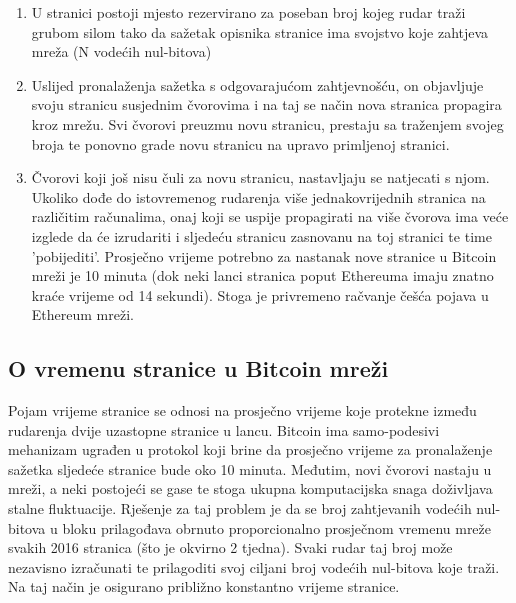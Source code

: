 \documentclass[utf8, zavrsni]{fer}
\begin{document}
\begin{enumerate}
	\item U stranici postoji mjesto rezervirano za poseban broj kojeg rudar traži grubom silom tako da sažetak opisnika stranice ima svojstvo koje zahtjeva mreža (N vodećih nul-bitova)\footnotemark
	\item Uslijed pronalaženja sažetka s odgovarajućom zahtjevnošću, on objavljuje svoju stranicu susjednim čvorovima i na taj se način nova stranica propagira kroz mrežu. Svi čvorovi preuzmu novu stranicu, prestaju sa traženjem svojeg broja te ponovno grade novu stranicu na upravo primljenoj stranici.
	\item Čvorovi koji još nisu čuli za novu stranicu, nastavljaju se natjecati s njom. Ukoliko dođe do istovremenog rudarenja više jednakovrijednih stranica na različitim računalima, onaj koji se uspije propagirati na više čvorova ima veće izglede da će izrudariti i sljedeću stranicu zasnovanu na toj stranici te time 'pobijediti'\footnotemark \footnotemark. Prosječno vrijeme potrebno za nastanak nove stranice u Bitcoin mreži je 10 minuta (dok neki lanci stranica poput Ethereuma imaju znatno kraće vrijeme od 14 sekundi). Stoga je privremeno račvanje češća pojava u Ethereum mreži.
\end{enumerate}

\subsection{O vremenu stranice u Bitcoin mreži}
Pojam vrijeme stranice se odnosi na prosječno vrijeme koje protekne između rudarenja dvije uzastopne stranice u lancu. Bitcoin ima samo-podesivi mehanizam ugrađen u protokol koji brine da prosječno vrijeme za pronalaženje sažetka sljedeće stranice bude oko 10 minuta. Međutim, novi čvorovi nastaju u mreži, a neki postojeći se gase te stoga ukupna komputacijska snaga doživljava stalne fluktuacije. Rješenje za taj problem je da se broj zahtjevanih vodećih nul-bitova u bloku prilagođava obrnuto proporcionalno prosječnom vremenu mreže svakih 2016 stranica (što je okvirno 2 tjedna). Svaki rudar taj broj može nezavisno izračunati te prilagoditi svoj ciljani broj vodećih nul-bitova koje traži. Na taj način je osigurano približno konstantno vrijeme stranice.
\end{document}
